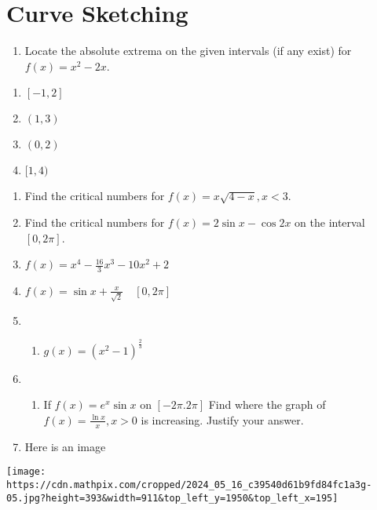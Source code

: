 \documentclass[
]{article}
\author{}
\date{}
\providecommand{\tightlist}{%
  \setlength{\itemsep}{0pt}\setlength{\parskip}{0pt}}
\begin{document}
\section{Curve Sketching}\label{curve-sketching}

\begin{enumerate}
\def\labelenumi{\arabic{enumi}.}
\tightlist
\item
  Locate the absolute extrema on the given intervals (if any exist) for
  \(f(x)=x^{2}-2 x\).
\end{enumerate}

\begin{enumerate}
\def\labelenumi{\alph{enumi})}
\tightlist
\item
  \([-1,2]\)
\item
  \((1,3)\)
\item
  \((0,2)\)
\item
  \([1,4)\)
\end{enumerate}

\begin{enumerate}
\def\labelenumi{\arabic{enumi}.}
\setcounter{enumi}{1}
\item
  Find the critical numbers for \(f(x)=x \sqrt{4-x}, x<3\).
\item
  Find the critical numbers for \(f(x)=2 \sin x-\cos 2 x\) on the
  interval \([0,2 \pi]\).
\item
  \(f(x)=x^{4}-\frac{16}{3} x^{3}-10 x^{2}+2\)
\item
  \(f(x)=\sin x+\frac{x}{\sqrt{2}} \quad[0,2 \pi]\)
\item
  \begin{enumerate}
  \def\labelenumii{\arabic{enumii}.}
  \setcounter{enumii}{5}
  \tightlist
  \item
    \(g(x)=\left(x^{2}-1\right)^{\frac{2}{3}}\)
  \end{enumerate}
\item
  \begin{enumerate}
  \def\labelenumii{\arabic{enumii}.}
  \setcounter{enumii}{6}
  \tightlist
  \item
    If \(f(x)=e^{x} \sin x\) on \([-2\pi. 2\pi]\) Find where the graph
    of \(f(x)=\frac{\ln x}{x}, x>0\) is increasing. Justify your answer.
  \end{enumerate}
\item
  Here is an image
\end{enumerate}

\texttt{[image: https://cdn.mathpix.com/cropped/2024\_05\_16\_c39540d61b9fd84fc1a3g-05.jpg?height=393\&width=911\&top\_left\_y=1950\&top\_left\_x=195]}
\end{document}
